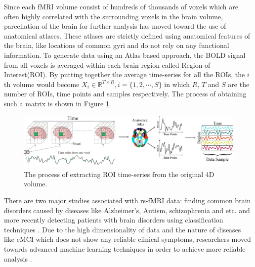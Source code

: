 \documentclass[preprint,12pt]{elsarticle}
\begin{document}
	Since each fMRI volume consist of hundreds of thousands of voxels which are often highly correlated with the surrounding voxels in the brain volume, parcellation of the brain for further analysis has moved toward the use
	of anatomical atlases. These atlases are strictly defined using
	anatomical features of the brain, like locations of common gyri
	and do not rely on any functional information.
	To generate data
	using an Atlas based approach, the BOLD signal from all voxels is averaged within each brain region called Region of Interest(ROI)\cite{r09}.
	By putting together the average time-series for all the ROIs, the $i$th volume would become $X_i \in \mathbb{R}^{T \times R} , i = \{1,2,\cdots, S\}$ in which $R$, $T$ and $S$ are the number of ROIs, time points and samples respectively. 
	The process of obtaining such a matrix is shown in Figure \ref{g1.1}.%
			\begin{figure}[!t]
			\centering
			\includegraphics[width=5.5in]{Data}
			\caption{The process of extracting ROI time-series from the original 4D volume. }
			\label{g1.1}
		\end{figure}
	
%	    
	    	There are two major studies associated with rs-fMRI data: finding common brain disorders caused by diseases like Alzheimer's, Autism, schizophrenia and etc. and more recently detecting patients with brain disorders using classification techniques \cite{r35,r36}. Due to the high dimensionality of data and the nature of diseases like eMCI which does not show any reliable clinical symptoms,
	    	researchers moved towards advanced machine learning techniques in order to achieve more reliable analysis \cite{r37}.
	    	
\end{document}
